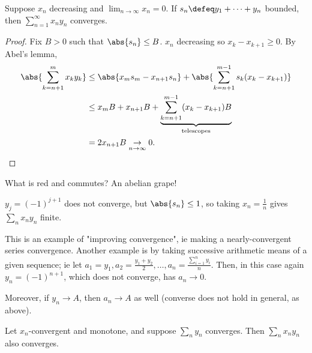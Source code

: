 \begin{theorem}
    Suppose $x_n$ decreasing and $\lim_{n \to \infty} x_n = 0$. If $s_n \defeq y_1+ \cdots +y_n$ bounded, then $\sum_{n=1}^\infty x_n y_n$ converges.
\end{theorem}

\begin{proof}
    Fix $B > 0$ such that $\abs{s_n} \leq B$. $x_n$ decreasing so $x_{k} - x_{k+1} \geq 0$. By Abel's lemma, \begin{align*}
        \abs{\sum_{k=n+1}^m x_{k} y_k} &\leq \abs{x_m s_m - x_{n+1} s_n} + \abs{\sum_{k=n+1}^{m-1} s_k(x_k - x_{k+1})}\\
        &\leq x_m B + x_{n+1}B + \underbrace{\sum_{k=n+1}^{m-1} (x_{k} - x_{k+1})B}_{\text{telescopes}}\\
        &= 2 x_{n+1} B \underset{n \to \infty}{\to} 0.
    \end{align*}
\end{proof}

\begin{remark}
    What is red and commutes? An abelian grape!
\end{remark}


\begin{example}
    $y_j = (-1)^{j+1}$ does not converge, but $\abs{s_n} \leq 1$, so taking $x_n = \frac{1}{n}$ gives $\sum_n x_n y_n$ finite.

    This is an example of "improving convergence", ie making a nearly-convergent series convergence. Another example is by taking successive arithmetic means of a given sequence; ie let $a_1 = y_1, a_2 = \frac{y_1 + y_2}{2}, \dots, a_n = \frac{\sum_{i=1}^n y_i}{n}$. Then, in this case again $y_n = (-1)^{n+1}$, which does not converge, has $a_n \to 0$. 

    Moreover, if $y_n \to A$, then $a_n \to A$ as well (converse does not hold in general, as above).
\end{example}

\begin{theorem}
    Let $x_n$-convergent and monotone, and suppose $\sum_{n} y_n$ converges. Then $\sum_n x_n y_n$ also converges.
\end{theorem}


